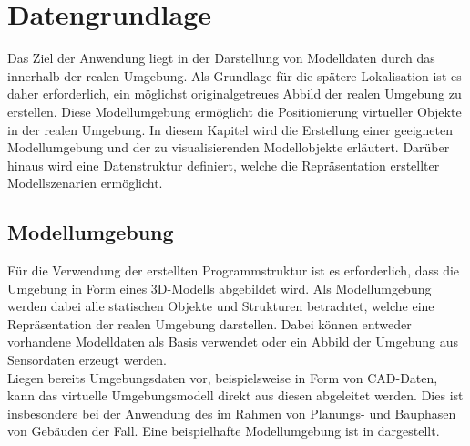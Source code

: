 \chapter{Datengrundlage}
\label{chap.modeldata}
\prever{
}

Das Ziel der Anwendung liegt in der Darstellung von Modelldaten durch das \kps{} innerhalb der realen Umgebung. Als Grundlage für die spätere Lokalisation ist es daher erforderlich, ein möglichst originalgetreues Abbild der realen Umgebung zu erstellen. Diese Modellumgebung ermöglicht die Positionierung virtueller Objekte in der realen Umgebung. In diesem Kapitel wird die Erstellung einer geeigneten Modellumgebung und der zu visualisierenden Modellobjekte erläutert. Darüber hinaus wird eine Datenstruktur definiert, welche die Repräsentation erstellter Modellszenarien ermöglicht.


\section{Modellumgebung}
\label{chap.slam}
Für die Verwendung der erstellten Programmstruktur ist es erforderlich, dass die Umgebung in Form eines 3D-Modells abgebildet wird. Als Modellumgebung werden dabei alle statischen Objekte und Strukturen betrachtet, welche eine Repräsentation der realen Umgebung darstellen. Dabei können entweder vorhandene Modelldaten als Basis verwendet oder ein Abbild der Umgebung aus Sensordaten erzeugt werden.\\

Liegen bereits Umgebungsdaten vor, beispielsweise in Form von CAD-Daten, kann das virtuelle Umgebungsmodell direkt aus diesen abgeleitet werden. Dies ist insbesondere bei der Anwendung des  im Rahmen von Planungs- und Bauphasen von Gebäuden der Fall. Eine beispielhafte Modellumgebung ist in  dargestellt.\\

